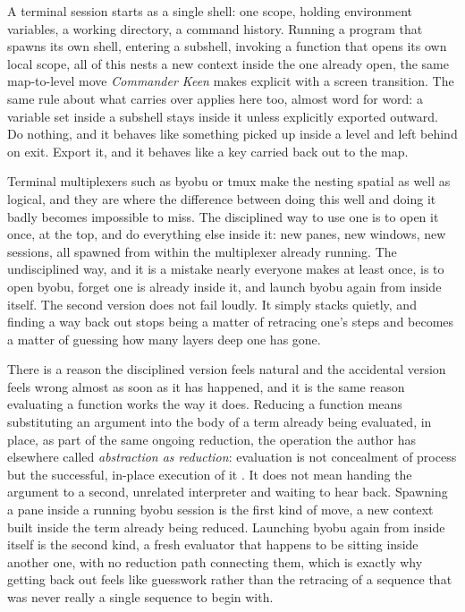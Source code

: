 \documentclass[11pt]{article}
\begin{document}
A terminal session starts as a single shell: one scope, holding environment variables, a working directory, a command history. Running a program that spawns its own shell, entering a subshell, invoking a function that opens its own local scope, all of this nests a new context inside the one already open, the same map-to-level move \emph{Commander Keen} makes explicit with a screen transition. The same rule about what carries over applies here too, almost word for word: a variable set inside a subshell stays inside it unless explicitly exported outward. Do nothing, and it behaves like something picked up inside a level and left behind on exit. Export it, and it behaves like a key carried back out to the map.

Terminal multiplexers such as byobu or tmux make the nesting spatial as well as logical, and they are where the difference between doing this well and doing it badly becomes impossible to miss. The disciplined way to use one is to open it once, at the top, and do everything else inside it: new panes, new windows, new sessions, all spawned from within the multiplexer already running. The undisciplined way, and it is a mistake nearly everyone makes at least once, is to open byobu, forget one is already inside it, and launch byobu again from inside itself. The second version does not fail loudly. It simply stacks quietly, and finding a way back out stops being a matter of retracing one's steps and becomes a matter of guessing how many layers deep one has gone.

There is a reason the disciplined version feels natural and the accidental version feels wrong almost as soon as it has happened, and it is the same reason evaluating a function works the way it does. Reducing a function means substituting an argument into the body of a term already being evaluated, in place, as part of the same ongoing reduction, the operation the author has elsewhere called \emph{abstraction as reduction}: evaluation is not concealment of process but the successful, in-place execution of it \cite{flyxion-reduction}. It does not mean handing the argument to a second, unrelated interpreter and waiting to hear back. Spawning a pane inside a running byobu session is the first kind of move, a new context built inside the term already being reduced. Launching byobu again from inside itself is the second kind, a fresh evaluator that happens to be sitting inside another one, with no reduction path connecting them, which is exactly why getting back out feels like guesswork rather than the retracing of a sequence that was never really a single sequence to begin with.
\end{document}
